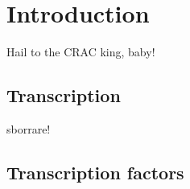 \documentclass{Thesis}
\begin{document}
\listoftodos
\frontmatter

\part{Introduction}

\begin{savequote}[70mm]
Hail to the CRAC king, baby!
\end{savequote}

\chapter{Transcription}


	
	
	
	

\begin{savequote}[70mm]
sborrare!
\end{savequote}

\chapter{Transcription factors}


	
	
	


%
%
%



\singlespacing


\end{document}
